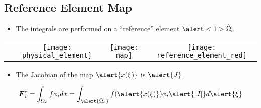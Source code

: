 \subsection*{Reference Element Map}


\begin{frame}[t]
  \begin{block}{}
    \begin{itemize}    
  \item{
    The integrals are performed on a ``reference'' element $\alert<1>{\hat{\Omega}_e}$
    }
  \end{itemize}
  \end{block}
    \begin{tabular}{p{}ccc} \\
      &
      \texttt{[image: physical\_element]}&
      \texttt{[image: map]}&
      \texttt{[image: reference\_element\_red]}
    \end{tabular}


      {
	\begin{block}{}
	\begin{itemize}    
	\item{
	  The Jacobian of the map $\alert{x(\xi)}$ is $\alert{J}$.
	}
	\end{itemize}
	\end{block}
	\begin{equation}
	  \nonumber
	  \bv{F}^e_{i} = \int_{\Omega_e} f \phi_i dx
	  =  \int_{\alert{\hat{\Omega}_e}}
	  f (\alert{x(\xi)}) \phi_i \alert{|J|} d\alert{\xi}
	\end{equation}
      }


\end{frame}
